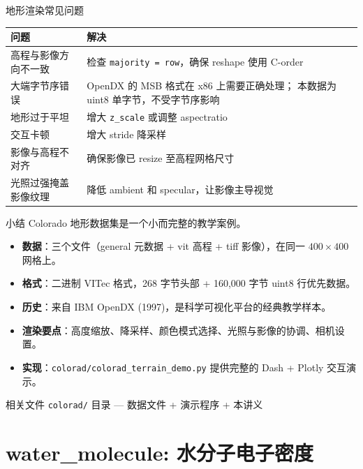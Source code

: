 \documentclass[aspectratio=169,11pt]{ctexbeamer}
\begin{document}
\begin{frame}{地形渲染常见问题}

  \begin{table}
    \centering
    \begin{tabularx}{\linewidth}{lX}
      \toprule
      问题 & 解决 \\
      \midrule
      高程与影像方向不一致 & 检查 \texttt{majority = row}，确保 reshape 使用 C-order \\
      大端字节序错误 & OpenDX 的 MSB 格式在 x86 上需要正确处理；
                         本数据为 uint8 单字节，不受字节序影响 \\
      地形过于平坦 & 增大 \texttt{z\_scale} 或调整 aspectratio \\
      交互卡顿 & 增大 stride 降采样 \\
      影像与高程不对齐 & 确保影像已 resize 至高程网格尺寸 \\
      光照过强掩盖影像纹理 & 降低 ambient 和 specular，让影像主导视觉 \\
      \bottomrule
    \end{tabularx}
  \end{table}
\end{frame}

\begin{frame}{小结}
  Colorado 地形数据集是一个小而完整的教学案例。

  \begin{itemize}
    \item \textbf{数据}：三个文件（general 元数据 + vit 高程 + tiff 影像），在同一 $400\times400$ 网格上。
    \item \textbf{格式}：二进制 VITec 格式，268 字节头部 + 160,000 字节 uint8 行优先数据。
    \item \textbf{历史}：来自 IBM OpenDX (1997)，是科学可视化平台的经典教学样本。
    \item \textbf{渲染要点}：高度缩放、降采样、颜色模式选择、光照与影像的协调、相机设置。
    \item \textbf{实现}：\texttt{colorad/colorad\_terrain\_demo.py} 提供完整的 Dash + Plotly 交互演示。
  \end{itemize}

  \begin{block}{相关文件}
    \texttt{colorad/} 目录 — 数据文件 + 演示程序 + 本讲义
  \end{block}
\end{frame}

\part{water\_molecule: 水分子电子密度}
\end{document}
